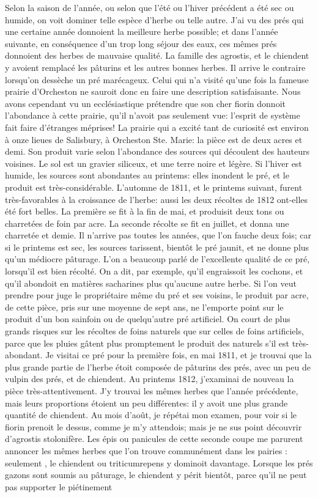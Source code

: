 Selon la saison de l'année, ou selon que l'été ou l'hiver précédent a été sec ou humide, on voit dominer telle espèce d'herbe ou telle autre. J'ai vu des prés qui une certaine année donnoient la meilleure herbe possible; et dans l'année suivante, en conséquence d'un trop long séjour des eaux, ces mêmes prés donnoient des herbes de mauvaise qualité. La famille des agrostis, et le chiendent y avoient remplacé les pâturins et les autres bonnes herbes. Il arrive le contraire lorsqu'on dessèche un pré marécageux. Celui qui n'a visité qu'une fois la fameuse prairie d'Orcheston ne sauroit donc en faire une description satisfaisante. Nous avons cependant vu un ecclésiastique prétendre que\setcounter{page}{68} son cher fiorin donnoit l'abondance à cette prairie, qu'il n'avoit pas seulement vue: l'esprit de système fait faire d'étranges méprises! La prairie qui a excité tant de curiosité est environ à onze lieues de Salisbury, à Orcheston Ste. Marie: la pièce est de deux acres et demi. Son produit varie selon l'abondance des sources qui découlent des hauteurs voisines. Le sol est un gravier siliceux, et une terre noire et légère. Si l'hiver est humide, les sources sont abondantes au printems: elles inondent le pré, et le produit est très-considérable. L'automne de 1811, et le printems suivant, furent très-favorables à la croissance de l'herbe: aussi les deux récoltes de 1812 ont-elles été fort belles. La première se fit à la fin de mai, et produisit deux tons ou charretées de foin par acre. La seconde récolte se fit en juillet, et donna une charretée et demie. Il n'arrive pas toutes les années, que l'on fauche deux fois; car si le printems est sec, les sources tarissent, bientôt le pré jaunit, et ne donne plus qu'un médiocre pâturage. L'on a beaucoup parlé de l'excellente qualité de ce pré, lorsqu'il est bien récolté. On a dit, par exemple, qu'il engraissoit\setcounter{page}{69} les cochons, et qu'il abondoit en matières sacharines plus qu'aucune autre herbe. Si l'on veut prendre pour juge le propriétaire même du pré et ses voisins, le produit par acre, de cette pièce, pris sur une moyenne de sept ans, ne l'emporte point sur le produit d'un bon sainfoin ou de quelqu'autre pré artificiel. On court de plus grands risques sur les récoltes de foins naturels que sur celles de foins artificiels, parce que les pluies gâtent plus promptement le produit des naturels s'il est très-abondant. Je visitai ce pré pour la première fois, en mai 1811, et je trouvai que la plus grande partie de l'herbe étoit composée de pâturins des prés, avec un peu de vulpin des prés, et de chiendent. Au printems 1812, j'examinai de nouveau la pièce très-attentivement. J'y trouvai les mêmes herbes que l'année précédente, mais leurs proportions étoient un peu différentes: il y avoit une plus grande quantité de chiendent. Au mois d'août, je répétai mon examen, pour voir si le fiorin prenoit le dessus, comme je m'y attendois; mais je ne sus point découvrir d'agrostis stolonifère. Les épis ou panicules de cette seconde coupe me parurent annoncer les mêmes herbes que l'on trouve communément\setcounter{page}{70} dans les pairies : seulement , le chiendent ou triticumrepens y dominoit davantage. Lorsque les prés gazons sont soumis au pâturage, le chiendent y périt bientôt, parce qu'il ne peut pas supporter le piétinement 